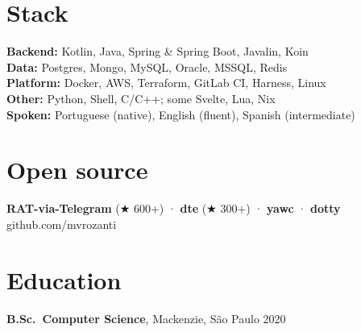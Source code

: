 \documentclass[10pt,a4paper]{article}
\begin{document}
\section{Stack}
\textbf{Backend:} Kotlin, Java, Spring \& Spring Boot, Javalin, Koin \\
\textbf{Data:} Postgres, Mongo, MySQL, Oracle, MSSQL, Redis \\
\textbf{Platform:} Docker, AWS, Terraform, GitLab CI, Harness, Linux \\
\textbf{Other:} Python, Shell, C/C++; some Svelte, Lua, Nix\\
\textbf{Spoken:} Portuguese (native), English (fluent), Spanish (intermediate)

\section{Open source}
\textbf{RAT-via-Telegram} (★ 600+) · \textbf{dte} (★ 300+) · \textbf{yawc} · \textbf{dotty} \hfill github.com/mvrozanti

\section{Education}
\textbf{B.Sc.\ Computer Science}, Mackenzie, São Paulo \hfill 2020
\end{document}
